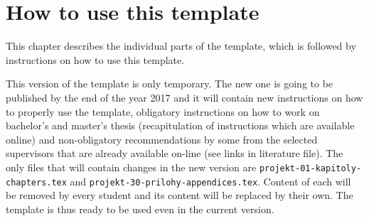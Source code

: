 





\chapter{How to use this template}
\label{how}

This chapter describes the individual parts of the template, which is followed by instructions on how to use this template.

This version of the template is only temporary. The new one is going to be published by the end of the year 2017 and it will contain new instructions on how to properly use the template, obligatory instructions on how to work on bachelor's and master's thesis (recapitulation of instructions which are available online) and non-obligatory recommendations by some from the selected supervisors that are already available on-line (see links in literature file). The only files that will contain changes in the new version are \texttt{projekt-01-kapitoly-chapters.tex} and \texttt{projekt-30-prilohy-appendices.tex}. Content of each will be removed by every student and its content will be replaced by their own. The template is thus ready to be used even in the current version.\cite{fitWeb}
